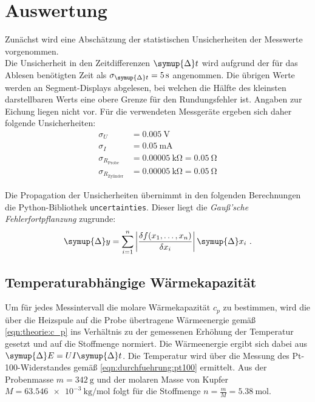 \section{Auswertung}
\label{sec:auswertung}

Zunächst wird eine Abschätzung der statistischen Unsicherheiten der Messwerte vorgenommen. \\
Die Unsicherheit in den Zeitdifferenzen $\symup{\Delta}t$ wird aufgrund der für das Ablesen benötigten Zeit
als $\sigma_{\symup{\Delta}t} = \SI{5}{\second}$ angenommen.
Die übrigen Werte werden an Segment-Displays abgelesen,
bei welchen die Hälfte des kleinsten darstellbaren Werts eine obere Grenze für den Rundungsfehler ist.
Angaben zur Eichung liegen nicht vor.
Für die verwendeten Messgeräte ergeben sich daher folgende Unsicherheiten:
\begin{align*}
    \sigma_{U} &= \SI{0.005}{\volt} \\
    \sigma_{I} &= \SI{0.05}{\milli\ampere} \\
    \sigma_{R_\text{Probe}} &= \SI{0.00005}{\kilo\ohm} = \SI{0.05}{\ohm} \\
    \sigma_{R_\text{Zylinder}} &= \SI{0.00005}{\kilo\ohm} = \SI{0.05}{\ohm}
\end{align*}

Die Propagation der Unsicherheiten übernimmt in den folgenden Berechnungen die Python-Bibliothek \texttt{uncertainties}.
Dieser liegt die \emph{Gauß'sche Fehlerfortpflanzung} zugrunde:
\begin{equation*}
    \symup{\Delta} y = \sum_{i=1}^n \left| \frac{\delta f(x_1, \ldots, x_n)}{\delta x_i} \right| \symup{\Delta} x_i \ .
\end{equation*}


\subsection{Temperaturabhängige Wärmekapazität}
Um für jedes Messintervall die molare Wärmekapazität $c_p$ zu bestimmen,
wird die über die Heizspule auf die Probe übertragene Wärmeenergie
gemäß \autoref{eqn:theorie:c_p}
ins Verhältnis zu der gemessenen Erhöhung der Temperatur gesetzt
und auf die Stoffmenge normiert.
Die Wärmeenergie ergibt sich dabei aus $\symup{\Delta}E = U I \symup{\Delta}t$.
Die Temperatur wird über die Messung des Pt-100-Widerstandes gemäß \autoref{eqn:durchfuehrung:pt100} ermittelt.
Aus der Probenmasse $m = \SI{342}{\gram}$ \cite{versuchsanleitung}
und der molaren Masse von Kupfer $M = \SI{63.546e-3}{\kilogram\per\mol}$ \cite{periodictable}
folgt für die Stoffmenge $n = \frac{m}{M} = \SI{5.38}{\mol}$.


